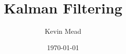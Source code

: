 %
%
%
%
%
%
%
%
%
%
%
%
%
%
%
%
%
%
%
%
%
%
%
%
%
%
%
%
%
%
%
%
%
%
%
%
%
%
%
%
%
%
%
%
%
 \title{Kalman Filtering} 
\author{Kevin Mead}

\date{\today} 
\maketitle 






 

